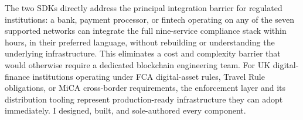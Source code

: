 \documentclass[11pt,a4paper]{article}
\begin{document}
The two SDKs directly address the principal integration barrier for regulated institutions: a bank, payment processor, or fintech operating on any of the seven supported networks can integrate the full nine-service compliance stack within hours, in their preferred language, without rebuilding or understanding the underlying infrastructure. This eliminates a cost and complexity barrier that would otherwise require a dedicated blockchain engineering team. For UK digital-finance institutions operating under FCA digital-asset rules, Travel Rule obligations, or MiCA cross-border requirements, the enforcement layer and its distribution tooling represent production-ready infrastructure they can adopt immediately. I designed, built, and sole-authored every component.
\end{document}
